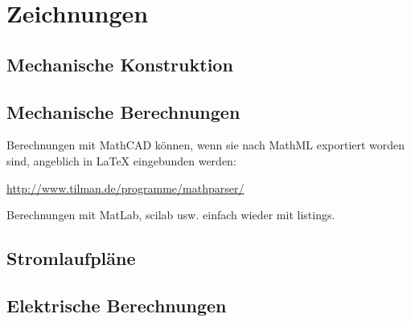 	  	\chapter{Zeichnungen}
		  	\section{Mechanische Konstruktion}
		  	
		  	\section{Mechanische Berechnungen}
		  		Berechnungen mit MathCAD können, wenn sie nach MathML exportiert worden sind, angeblich in \LaTeX{} eingebunden werden:
		  		
		  		\href{http://www.tilman.de/programme/mathparser/}{http://www.tilman.de/programme/mathparser/}
		  		
		  		Berechnungen mit MatLab, scilab usw. einfach wieder mit listings.
		  		
		  	\section{Stromlaufpläne}
		  	
		  	\section{Elektrische Berechnungen}